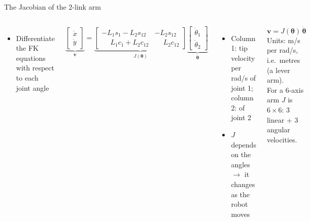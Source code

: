\documentclass[aspectratio=169,10pt]{beamer}
\begin{document}
\begin{frame}[t]{The Jacobian of the 2-link arm}
\begin{columns}[T,onlytextwidth]
\begin{itemize}\small
\item Differentiate the FK equations with respect to each joint angle
\end{itemize}
\begin{eqbox}
\[ \underbrace{\begin{bmatrix}\dot x\\ \dot y\end{bmatrix}}_{\bm v} =
\underbrace{\begin{bmatrix} -L_1 s_1 - L_2 s_{12} & -L_2 s_{12}\\ \phantom{-}L_1 c_1 + L_2 c_{12} & \phantom{-}L_2 c_{12}\end{bmatrix}}_{J(\bm\theta)}
\underbrace{\begin{bmatrix}\dot\theta_1\\ \dot\theta_2\end{bmatrix}}_{\dot{\bm\theta}} \]
\end{eqbox}
\begin{itemize}\small
\item Column 1: tip velocity per rad/s of joint 1; column 2: of joint 2
\item $J$ depends on the angles $\rightarrow$ it changes as the robot moves
\end{itemize}
\begin{keybox}
\small
\[ \bm v = J(\bm\theta)\,\dot{\bm\theta} \]
Units: \si{m/s} per \si{rad/s}, i.e.\ metres (a lever arm).\\[1mm]
For a 6-axis arm $J$ is $6\times6$: 3 linear + 3 angular velocities.
\end{keybox}
\end{columns}
\end{frame}
\end{document}
